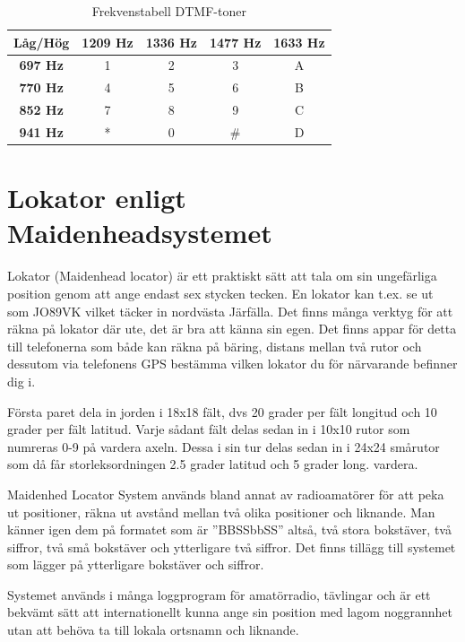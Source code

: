 \begin{table}[H]
\centering
\begin{tabular}{c|cccc}
	\textbf{Låg/Hög} & \textbf{1209 Hz} & \textbf{1336 Hz} & \textbf{1477 Hz} & \textbf{1633 Hz} \\ \hline
	\textbf{697 Hz}  &        1         &        2         &        3         &        A         \\
	\textbf{770 Hz}  &        4         &        5         &        6         &        B         \\
	\textbf{852 Hz}  &        7         &        8         &        9         &        C         \\
	\textbf{941 Hz}  &        *         &        0         &        \#        &        D
\end{tabular}
\caption{Frekvenstabell DTMF-toner}
\end{table}


\section{Lokator enligt Maidenheadsystemet}
\label{sec:lokator}

Lokator (Maidenhead locator) är ett praktiskt sätt att tala om sin ungefärliga
position genom att ange endast sex stycken tecken. En lokator kan t.ex. se ut
som JO89VK vilket täcker in nordvästa Järfälla. Det finns många verktyg för
att räkna på lokator där ute, det är bra att känna sin egen. Det finns appar
för detta till telefonerna som både kan räkna på bäring, distans mellan två
rutor och dessutom via telefonens GPS bestämma vilken lokator du för
närvarande befinner dig i.

Första paret dela in jorden i 18x18 fält, dvs 20 grader per fält longitud och
10 grader per fält latitud. Varje sådant fält delas sedan in i 10x10 rutor som
numreras 0-9 på vardera axeln. Dessa i sin tur delas sedan in i 24x24 smårutor
som då får storleksordningen 2.5 grader latitud och 5 grader long. vardera.


Maidenhed Locator System används bland annat av radioamatörer för att peka ut
positioner, räkna ut avstånd mellan två olika positioner och liknande. Man
känner igen dem på formatet som är ''BBSSbbSS'' altså, två stora bokstäver,
två siffror, två små bokstäver och ytterligare två siffror. Det finns tillägg
till systemet som lägger på ytterligare bokstäver och siffror.

Systemet används i många loggprogram för amatörradio, tävlingar och är ett
bekvämt sätt att internationellt kunna ange sin position med lagom noggrannhet
utan att behöva ta till lokala ortsnamn och liknande.


